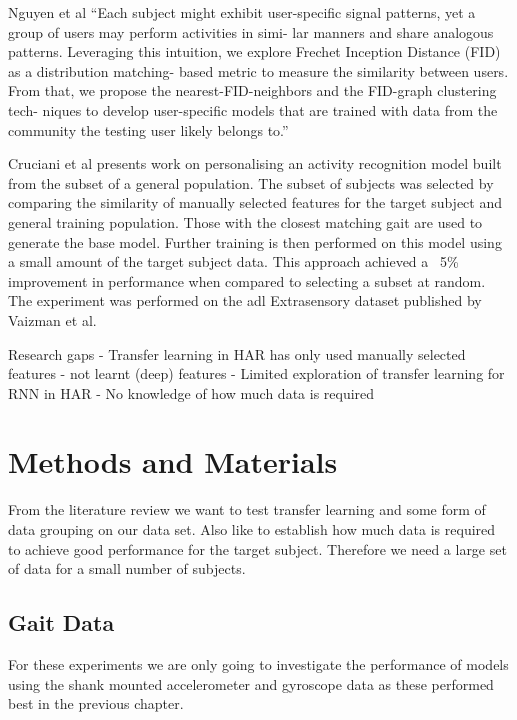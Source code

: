 Nguyen et al ``Each subject might exhibit user-specific signal patterns, yet a group of users may perform activities in simi- lar manners and share analogous patterns. Leveraging this intuition, we explore Frechet Inception Distance (FID) as a distribution matching- based metric to measure the similarity between users. From that, we propose the nearest-FID-neighbors and the FID-graph clustering tech- niques to develop user-specific models that are trained with data from the community the testing user likely belongs to.'' \cite{Nguyen2021}


Cruciani et al presents work on personalising an activity recognition model built from the subset of a general population. The subset of subjects was selected by comparing the similarity of manually selected features for the target subject and general training population. Those with the closest matching gait are used to generate the base model. Further training is then performed on this model using a small amount of the target subject data. This approach achieved a ~5\% improvement in performance when compared to selecting a subset at random\cite{Cruciani2020}. The experiment was performed on the \acrshort{adl} Extrasensory dataset published by Vaizman et al\cite{Vaizman2017}.


Research gaps
- Transfer learning in HAR has only used manually selected features - not learnt (deep) features
- Limited exploration of transfer learning for RNN in HAR
- No knowledge of how much data is required


\section{Methods and Materials}
\label{sec:personalistaion-methods}
From the literature review we want to test transfer learning and some form of data grouping on our data set. Also like to establish how much data is required to achieve good performance for the target subject. Therefore we need a large set of data for a small number of subjects.

\subsection{Gait Data}
For these experiments we are only going to investigate the performance of models using the shank mounted accelerometer and gyroscope data as these performed best in the previous chapter.

